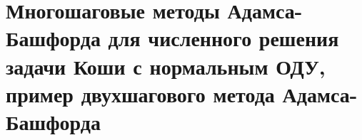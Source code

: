\documentclass[__main__.tex]{subfiles}
\begin{document}
\section{Многошаговые методы Адамса-Башфорда для численного решения задачи Коши с нормальным ОДУ, пример двухшагового метода Адамса- Башфорда}
\end{document}

